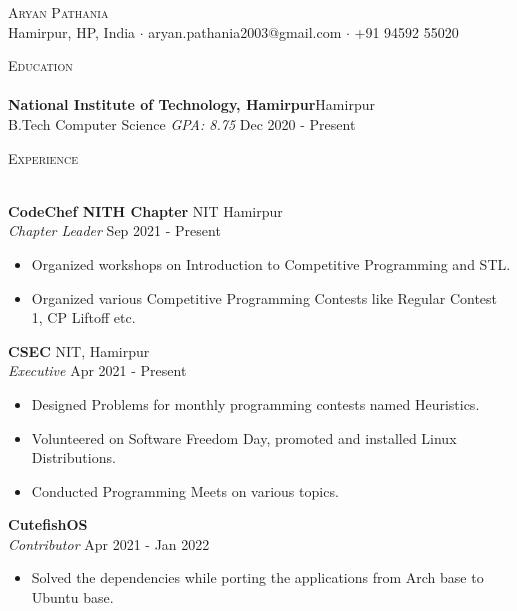 \documentclass[a4paper]{article}
\newcommand{\lineunder} {
    \vspace*{-8pt} \\
    \hspace*{-18pt} \hrulefill \\
}
\newcommand{\header} [1] {
    {\hspace*{-18pt}\vspace*{6pt} \textsc{#1}}
    \vspace*{-6pt} \lineunder
}
\begin{document}
\vspace*{-40pt}



\vspace*{-10pt}
\begin{center}
	{\Huge \scshape {Aryan Pathania}}\\
	Hamirpur, HP, India $\cdot$ aryan.pathania2003@gmail.com $\cdot$ +91 94592 55020\\
\end{center}

\header{Education}
\textbf{National Institute of Technology, Hamirpur}\hfill Hamirpur\\
B.Tech Computer Science \textit{GPA: 8.75} \hfill Dec 2020 - Present\\
\vspace{2mm}

\header{Experience}
\vspace{1mm}

\textbf{CodeChef NITH Chapter} \hfill NIT Hamirpur\\
\textit{Chapter Leader} \hfill Sep 2021 - Present\\
\vspace{-1mm}
\begin{itemize} \itemsep 1pt
	\item Organized workshops on Introduction to Competitive Programming and STL.
	\item Organized various Competitive Programming Contests like Regular Contest 1, CP Liftoff etc.
\end{itemize}
\textbf{CSEC} \hfill NIT, Hamirpur\\
\textit{Executive} \hfill Apr 2021 - Present\\
\vspace{-1mm}
\begin{itemize} \itemsep 1pt
	\item Designed Problems for monthly programming contests named Heuristics.
	\item Volunteered on Software Freedom Day, promoted and installed Linux Distributions.
	\item Conducted Programming Meets on various topics.
\end{itemize}
\textbf{CutefishOS}\\
\textit{Contributor} \hfill Apr 2021 - Jan 2022\\
\vspace{-1mm}
\begin{itemize} \itemsep 1pt
	\item Solved the dependencies while porting the applications from Arch base to Ubuntu base.
\end{itemize}
\end{document}
